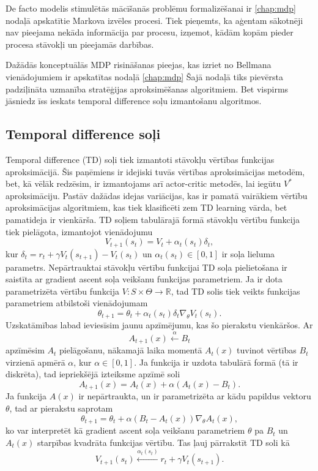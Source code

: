 \documentclass{ludis} %
\begin{document}
De facto modelis stimulētās mācīšanās problēmu formalizēšanai ir \ref{chap:mdp} nodaļā apskatītie Markova izvēles procesi.
Tiek pieņemts, ka aģentam sākotnēji nav pieejama nekāda informācija par procesu, izņemot, kādām kopām pieder procesa stāvokļi un pieejamās darbības.

Dažādās konceptuālās MDP risināšanas pieejas, kas izriet no Bellmana vienādojumiem ir apskatītas nodaļā \ref{chap:mdp}
Šajā nodaļā tiks pievērsta padziļināta uzmanība stratēģijas aproksimēšanas algoritmiem.
Bet vispirms jāsniedz īss ieskats temporal difference soļu izmantošanu algoritmos.

\subsection{Temporal difference soļi} \label{chap:td}
Temporal difference (TD) soļi tiek izmantoti stāvokļu vērtības funkcijas aproksimācijā.
Šis paņēmiens ir idejiski tuvās vērtības aproksimācijas metodēm, bet, kā vēlāk redzēsim, ir izmantojams arī actor-critic metodēs, lai iegūtu $V^*$ aproksimāciju.
Pastāv dažādas idejas variācijas, kas ir pamatā vairākiem vērtību aproksimācijas algoritmiem, kas tiek klasificēti zem TD learning vārda, bet pamatideja ir vienkārša.
TD soļiem tabulārajā formā stāvokļu vērtību funkcija tiek pielāgota, izmantojot vienādojumu
\[
	V_{t+1}(s_t) = V_t + \alpha_t(s_t) \delta_t,
\]
kur $\delta_t = r_{t} + \gamma V_t(s_{t + 1}) - V_t(s_t)$ un $\alpha_t(s_t) \in [0,1]$ ir soļa lieluma parametrs.
Nepārtrauktai stāvokļu vērtību funkcijai TD soļa pielietošana ir saistīta ar gradient ascent soļa veikšanu funkcijas parametriem.
Ja ir dota parametrizēta vērtību funkcija $V:S \times \Theta \rightarrow \mathbb{R}$, tad TD solis tiek veikts funkcijas parametriem atbilstoši vienādojumam
\[
	\theta_{t+1} = \theta_t + \alpha_t(s_t) \delta_t \nabla_\theta V_t(s_t).
\]
Uzskatāmības labad ieviesīsim jaunu apzīmējumu, kas šo pierakstu vienkāršos.
Ar
\[
	A_{t+1}(x) \xleftarrow{\alpha} B_t
\]
apzīmēsim $A_t$ pielāgošanu, nākamajā laika momentā $A_t(x)$ tuvinot vērtības $B_t$ virzienā apmērā $\alpha$, kur $\alpha \in [0,1]$.
Ja funkcija ir uzdota tabulārā formā (tā ir diskrēta), tad iepriekšējā izteiksme apzīmē soli
\[
	A_{t+1}(x) = A_t(x) + \alpha(A_t(x) - B_t).
\]
Ja funkcija $A(x)$ ir nepārtraukta, un ir parametrizēta ar kādu papildus vektoru $\theta$, tad ar pierakstu saprotam
\[
	\theta_{t+1} = \theta_t + \alpha \left(B_t - A_t(x)\right) \nabla_\theta A_t(x),
\]
ko var interpretēt kā gradient ascent soļa veikšanu parametriem $\theta$ pa $B_t$ un $A_t(x)$ starpības kvadrāta funkcijas vērtību.
Tas ļauj pārrakstīt TD soli kā
\[
	V_{t+1}(s_t) \xleftarrow{\alpha_t(s_t)} r_t + \gamma V_t(s_{t + 1}).
\]
\end{document}
